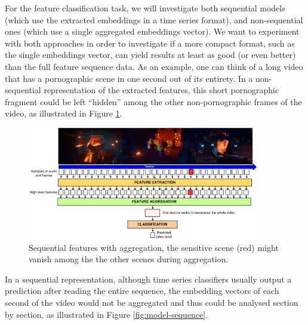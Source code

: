 For the feature classification task, we will investigate both sequential models (which use the extracted embeddings in a time series format), and non-sequential ones (which use a single aggregated embeddings vector).
We want to experiment with both approaches in order to investigate if a more compact format, such as the single embeddings vector, can yield results at least as good (or even better) than the full feature sequence data.
As an example, one can think of a long video that has a pornographic scene in one second out of its entirety. 
In a non-sequential representation of the extracted features, this short pornographic fragment could be left ``hidden'' among the other non-pornographic frames of the video, as illustrated in Figure \ref{fig:model-non-sequence}.
\begin{figure}[!ht]
    \centering
    \includegraphics[width=0.9\textwidth]{img/model-non-sequence.png}
    \caption{Sequential features with aggregation, the sensitive scene (red) might vanish among the the other scenes during aggregation.}
    \label{fig:model-non-sequence}
    \vspace{-1em}
\end{figure}
In a sequential representation, although time series classifiers usually output a prediction after reading the entire sequence, the embedding vectors of each second of the video would not be aggregated and thus could be analysed section by section, as illustrated in Figure \ref{fig:model-sequence}.

